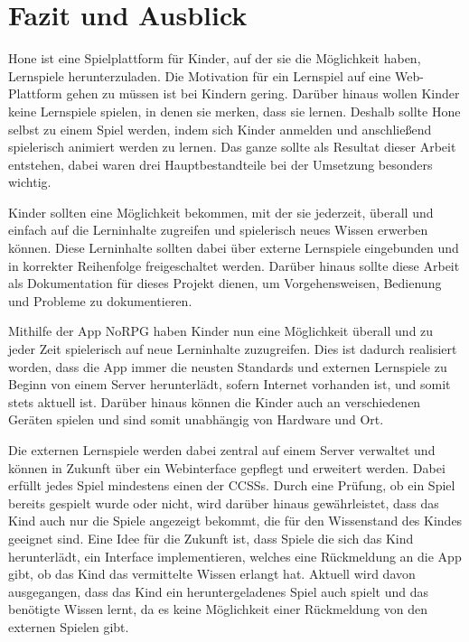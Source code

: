 \chapter{Fazit und Ausblick}

Hone ist eine Spielplattform für Kinder, auf der sie die Möglichkeit haben, Lernspiele herunterzuladen. Die Motivation für ein Lernspiel auf eine Web-Plattform gehen zu müssen ist bei Kindern gering. Darüber hinaus wollen Kinder keine Lernspiele spielen, in denen sie merken, dass sie lernen. Deshalb sollte Hone selbst zu einem Spiel werden, indem sich Kinder anmelden und anschließend spielerisch animiert werden zu lernen. Das ganze sollte als Resultat dieser Arbeit entstehen, dabei waren drei Hauptbestandteile bei der Umsetzung besonders wichtig. 

Kinder sollten eine Möglichkeit bekommen, mit der sie jederzeit, überall und einfach auf die Lerninhalte zugreifen und spielerisch neues Wissen erwerben können. Diese Lerninhalte sollten dabei über externe Lernspiele eingebunden und in korrekter Reihenfolge freigeschaltet werden. Darüber hinaus sollte diese Arbeit als Dokumentation für dieses Projekt dienen, um Vorgehensweisen, Bedienung und Probleme zu dokumentieren. 

Mithilfe der App NoRPG haben Kinder nun eine Möglichkeit überall und zu jeder Zeit spielerisch auf neue Lerninhalte zuzugreifen. Dies ist dadurch realisiert worden, dass die App immer die neusten Standards und externen Lernspiele zu Beginn von einem Server herunterlädt, sofern Internet vorhanden ist, und somit stets aktuell ist. Darüber hinaus können die Kinder auch an verschiedenen Geräten spielen und sind somit unabhängig von Hardware und Ort. 

Die externen Lernspiele werden dabei zentral auf einem Server verwaltet und können in Zukunft über ein Webinterface gepflegt und erweitert werden. Dabei erfüllt jedes Spiel mindestens einen der \acp{CCSS}. Durch eine Prüfung, ob ein Spiel bereits gespielt wurde oder nicht, wird darüber hinaus gewährleistet, dass das Kind auch nur die Spiele angezeigt bekommt, die für den Wissenstand des Kindes geeignet sind. Eine Idee für die Zukunft ist, dass Spiele die sich das Kind herunterlädt, ein Interface implementieren, welches eine Rückmeldung an die App gibt, ob das Kind das vermittelte Wissen erlangt hat. Aktuell wird davon ausgegangen, dass das Kind ein heruntergeladenes Spiel auch spielt und das benötigte Wissen lernt, da es keine Möglichkeit einer Rückmeldung von den externen Spielen gibt.

